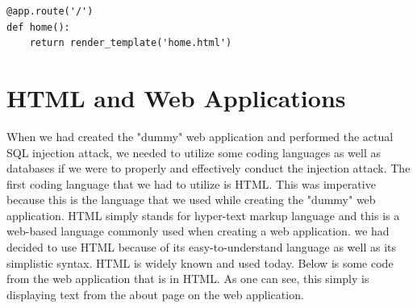 \bigskip
\bigskip

\begin{lstlisting}
@app.route('/')
def home():
    return render_template('home.html')
\end{lstlisting}


\section{HTML and Web Applications}
\label{sec:html and web applications}

When we had created the "dummy" web application and performed the actual SQL injection attack,
we needed to utilize some coding languages as well as databases if we were to properly
and effectively conduct the injection attack. The first coding language
that we had to utilize is HTML. This was imperative because this is the
language that we used while creating the "dummy" web application. HTML simply
stands for hyper-text markup language and this is a web-based language commonly
used when creating a web application. we had decided to use HTML because of its easy-to-understand
language as well as its simplistic syntax. HTML is widely known and used today. Below
is some code from the web application that is in HTML. As one can see, this simply is displaying
text from the about page on the web application.

